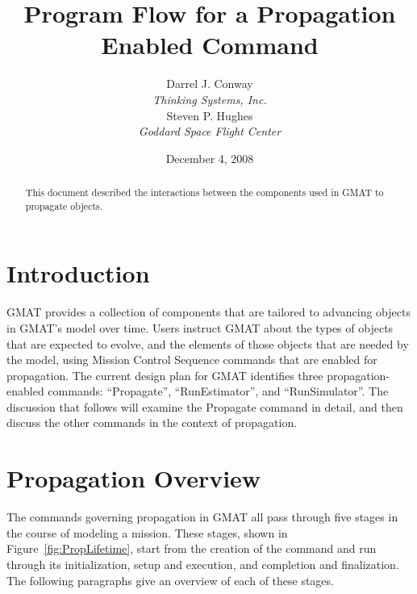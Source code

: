 \documentclass[11pt]{article}
\begin{document}
\title{Program Flow for a Propagation Enabled Command}
\author{Darrel J. Conway\\\textit{Thinking Systems, Inc.}\\
Steven P. Hughes\\\textit{Goddard Space Flight Center}}
\date{December 4, 2008}
\maketitle

\begin{abstract}
This document described the interactions between the components used in GMAT to propagate objects.
\end{abstract}

\section{Introduction}

GMAT provides a collection of components that are tailored to advancing objects in GMAT's model over time.  Users instruct GMAT about the types of objects that are expected to evolve, and the elements of those objects that are needed by the model, using Mission Control Sequence commands that are enabled for propagation.  The current design plan for GMAT identifies three propagation-enabled commands: ``Propagate'', ``RunEstimator'', and ``RunSimulator''.  The discussion that follows will examine the Propagate command in detail, and then discuss the other commands in the context of propagation.

\section{Propagation Overview}

The commands governing propagation in GMAT all pass through five stages in the course of modeling a mission.  These stages, shown in Figure~\ref{fig:PropLifetime}, start from the creation of the command and run through its initialization, setup and execution, and completion and finalization.  The following paragraphs give an overview of each of these stages.
\end{document}
